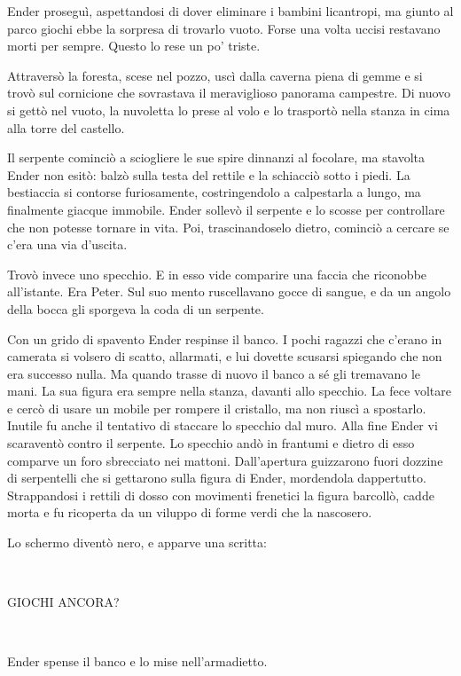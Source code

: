 {Ender proseguì, aspettandosi di dover eliminare i bambini licantropi,
	ma giunto al parco giochi ebbe la sorpresa di trovarlo vuoto. Forse una
	volta uccisi restavano morti per sempre. Questo lo rese un po' triste.}

{Attraversò la foresta, scese nel pozzo, uscì dalla caverna piena di
	gemme e si trovò sul cornicione che sovrastava il meraviglioso panorama
	campestre. Di nuovo si gettò nel vuoto, la nuvoletta lo prese al volo e
	lo trasportò nella stanza in cima alla torre del castello.}

{Il serpente cominciò a sciogliere le sue spire dinnanzi al focolare, ma
	stavolta Ender non esitò: balzò sulla testa del rettile e la schiacciò
	sotto i piedi. La bestiaccia si contorse furiosamente, costringendolo a
	calpestarla a lungo, ma finalmente giacque immobile. Ender sollevò il
	serpente e lo scosse per controllare che non potesse tornare in vita.
	Poi, trascinandoselo dietro, cominciò a cercare se c'era una via
	d'uscita.}

{Trovò invece uno specchio. E in esso vide comparire una faccia che
	riconobbe all'istante. Era Peter. Sul suo mento ruscellavano gocce di
	sangue, e da un angolo della bocca gli sporgeva la coda di un serpente.}

{Con un grido di spavento Ender respinse il banco. I pochi ragazzi che
	c'erano in camerata si volsero di scatto, allarmati, e lui dovette
	scusarsi spiegando che non era successo nulla. Ma quando trasse di nuovo
	il banco a sé gli tremavano le mani. La sua figura era sempre nella
	stanza, davanti allo specchio. La fece voltare e cercò di usare un
	mobile per rompere il cristallo, ma non riuscì a spostarlo. Inutile fu
	anche il tentativo di staccare lo specchio dal muro. Alla fine Ender vi
	scaraventò contro il serpente. Lo specchio andò in frantumi e dietro di
	esso comparve un foro sbrecciato nei mattoni. Dall'apertura guizzarono
	fuori dozzine di serpentelli che si gettarono sulla figura di Ender,
	mordendola dappertutto. Strappandosi i rettili di dosso con movimenti
	frenetici la figura barcollò, cadde morta e fu ricoperta da un viluppo
	di forme verdi che la nascosero.}

{Lo schermo diventò nero, e apparve una scritta:}

{~}

\begin{center}
	{GIOCHI ANCORA?}
\end{center}

{~}

{Ender spense il banco e lo mise nell'armadietto.}

